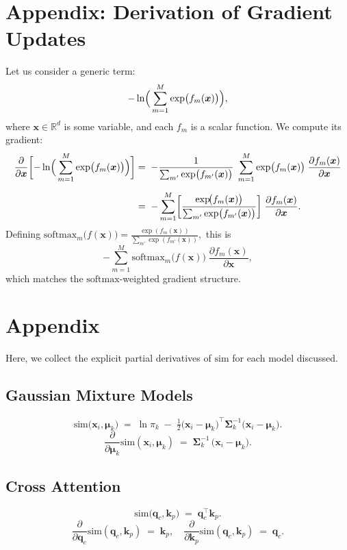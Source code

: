 \documentclass{article}
\begin{document}
  
    
    
\clearpage
\appendix

\section{Appendix: Derivation of Gradient Updates}

Let us consider a generic term:
\[
-\ln \Bigl(\,\sum_{m=1}^M \exp \bigl(f_m(\bm{x})\bigr)\Bigr),
\]
where \(\bm{x}\in \mathbb{R}^d\) is some variable, and each \(f_m\) is a scalar function.
We compute its gradient:
\begin{align*}
\frac{\partial}{\partial \bm{x}}
\biggl[
-\ln \Bigl(\,\sum_{m=1}^M \exp \bigl(f_m(\bm{x})\bigr)\Bigr)
\biggr]
&=\;
-\frac{1}{\sum_{m'} \exp \bigl(f_{m'}(\bm{x})\bigr)}
\;\sum_{m=1}^M
\exp \bigl(f_m(\bm{x})\bigr)\;\frac{\partial f_m(\bm{x})}{\partial \bm{x}}
\\[6pt]
&=\;
-\sum_{m=1}^M
\biggl[
\frac{\exp\!\bigl(f_m(\bm{x})\bigr)}{\sum_{m'} \exp \bigl(f_{m'}(\bm{x})\bigr)}
\biggr]
\;\frac{\partial f_m(\bm{x})}{\partial \bm{x}}.
\end{align*}
Defining
\(\mathrm{softmax}_m\bigl(f(\bm{x})\bigr) 
= 
\tfrac{\exp(f_m(\bm{x}))}{\sum_{m'} \exp(f_{m'}(\bm{x}))},\)
this is
\[
-\sum_{m=1}^M
\mathrm{softmax}_m \bigl(f(\bm{x})\bigr)
\;\frac{\partial f_m(\bm{x})}{\partial \bm{x}},
\]
which matches the \(\mathrm{softmax}\)-weighted gradient structure.


\section{Appendix}
\label{sec:deriv-sim-models}

Here, we collect the explicit partial derivatives of \(\mathrm{sim}\) for each model discussed.

\subsection*{Gaussian Mixture Models}
\[
\mathrm{sim}\bigl(\bm{x}_i, \bm{\mu}_k\bigr)
\;=\;
\ln \pi_k
\;-\;
\tfrac12 \bigl(\bm{x}_i - \bm{\mu}_k\bigr)^\top
\bm{\Sigma}_k^{-1}
\bigl(\bm{x}_i - \bm{\mu}_k\bigr).
\]
\[
\frac{\partial}{\partial \bm{\mu}_k} \mathrm{sim}(\bm{x}_i,\bm{\mu}_k)
\;=\;
\bm{\Sigma}_k^{-1}\,\bigl(\bm{x}_i - \bm{\mu}_k\bigr).
\]

\subsection*{Cross Attention}
\[
\mathrm{sim}\bigl(\bm{q}_c, \bm{k}_p\bigr)
\;=\;
\bm{q}_c^\top \bm{k}_p.
\]
\[
\frac{\partial}{\partial \bm{q}_c} \mathrm{sim}(\bm{q}_c,\bm{k}_p)
\;=\;
\bm{k}_p,
\quad
\frac{\partial}{\partial \bm{k}_p} \mathrm{sim}(\bm{q}_c,\bm{k}_p)
\;=\;
\bm{q}_c.
\]
\end{document}
